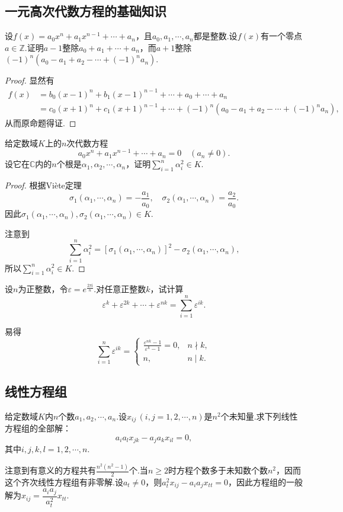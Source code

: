 \subsection{一元高次代数方程的基础知识}
\begin{prob}[6]
	设$f(x)=a_0x^n+a_1x^{n-1}+\cdots+a_n$，且$a_0,a_1,\cdots,a_n$都是整数.设$f(x)$有一个零点$a\in\mathbb{Z}$.证明$a-1$整除$a_0+a_1+\cdots+a_n$，而$a+1$整除$(-1)^n(a_0-a_1+a_2-\cdots+(-1)^na_n)$.
\end{prob}
\begin{proof}
	显然有
	\begin{align*}
		f(x) & =b_0(x-1)^n+b_1(x-1)^{n-1}+\cdots+a_0+\cdots+a_n                        \\
		     & =c_0(x+1)^n+c_1(x+1)^{n-1}+\cdots+(-1)^n(a_0-a_1+a_2-\cdots+(-1)^na_n),
	\end{align*}
	从而原命题得证.
\end{proof}
\begin{prob}[8]
	给定数域$K$上的$n$次代数方程
	\[
		a_0x^n+a_1x^{n-1}+\cdots+a_n=0\quad(a_n\ne0).
	\]
	设它在$\mathbb{C}$内的$n$个根是$\alpha_1,\alpha_2,\cdots,\alpha_n$，证明$\displaystyle\sum_{i=1}^n\alpha_i^2\in K$.
\end{prob}
\begin{proof}
	根据Viète定理
	\[
		\sigma_1(\alpha_1,\cdots,\alpha_n)=-\dfrac{a_1}{a_0},\quad
		\sigma_2(\alpha_1,\cdots,\alpha_n)=\dfrac{a_2}{a_0}.
	\]
	因此$\sigma_1(\alpha_1,\cdots,\alpha_n),\sigma_2(\alpha_1,\cdots,\alpha_n)\in K$.

	注意到
	\[
		\displaystyle\sum_{i=1}^n\alpha_i^2=[\sigma_1(\alpha_1,\cdots,\alpha_n)]^2-\sigma_2(\alpha_1,\cdots,\alpha_n),
	\]
	所以$\displaystyle\sum_{i=1}^n\alpha_i^2\in K$.
\end{proof}
\begin{prob}[9]
	设$n$为正整数，令$\varepsilon=e^{\frac{2\pi\mathrm{i}}{n}}$.对任意正整数$k$，试\hypertarget{UnitRootAddict}{计算}
	\[
		\varepsilon^k+\varepsilon^{2k}+\cdots+\varepsilon^{nk}=\sum_{i=1}^n\varepsilon^{ik}.
	\]
\end{prob}
\begin{sol}
	易得
	\[
		\sum_{i=1}^n\varepsilon^{ik}=
		\begin{cases}
			\frac{\varepsilon^{nk}-1}{\varepsilon^k-1}=0, & n\nmid k, \\
			n,                                            & n\mid k.
		\end{cases}
	\]
\end{sol}
\subsection{线性方程组}
\begin{prob}[10]
	给定数域$K$内$n$个数$a_1,a_2,\cdots,a_n$.设$x_{ij}\,(i,j=1,2,\cdots,n)$是$n^2$个未知量.求下列线性方程组的全部解：
	\[
		a_ia_lx_{jk}-a_ja_kx_{il}=0,
	\]
	其中$i,j,k,l=1,2,\cdots,n$.
\end{prob}
\begin{sol}
	注意到有意义的方程共有$\frac{n^2(n^2-1)}{2}$个.当$n\ge2$时方程个数多于未知数个数$n^2$，因而这个齐次线性方程组有非零解.设$a_t\ne0$，则$a_t^2x_{ij}-a_ia_jx_{tt}=0$，因此方程组的一般解为$x_{ij}=\dfrac{a_ia_j}{a_t^2}x_{tt}$.
\end{sol}